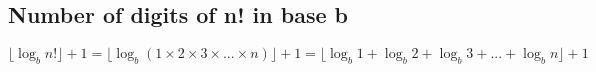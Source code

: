 \subsection{Number of digits of n! in base b}
$$ \lfloor \log _{b} n! \rfloor + 1 = \lfloor \log _{b} (1 \times 2 \times 3 \times ... \times n) \rfloor + 1 = \lfloor \log _{b} 1 + \log _{b} 2 + \log _{b} 3 + ... + \log _{b} n \rfloor + 1 $$
